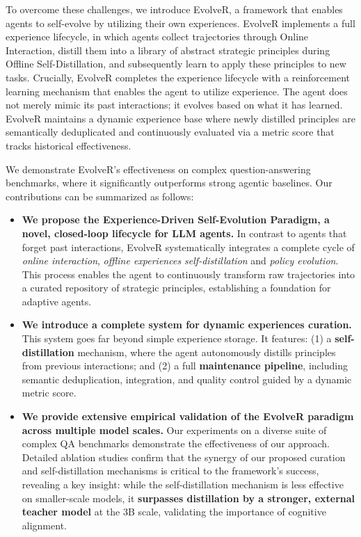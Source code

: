To overcome these challenges, we introduce EvolveR, a framework that enables agents to self-evolve by utilizing their own experiences. EvolveR implements a full experience lifecycle, in which agents collect trajectories through Online Interaction, distill them into a library of abstract strategic principles during Offline Self-Distillation, and subsequently learn to apply these principles to new tasks. Crucially, EvolveR completes the experience lifecycle with a reinforcement learning mechanism that enables the agent to utilize experience. The agent does not merely mimic its past interactions; it evolves based on what it has learned. EvolveR maintains a dynamic experience base where newly distilled principles are semantically deduplicated and continuously evaluated via a metric score that tracks historical effectiveness. 

We demonstrate EvolveR's effectiveness on complex question-answering benchmarks, where it significantly outperforms strong agentic baselines. Our contributions can be summarized as follows:

\begin{itemize}[leftmargin=2em]
    \item \textbf{We propose the Experience-Driven Self-Evolution Paradigm, a novel, closed-loop lifecycle for LLM agents.} In contrast to agents that forget past interactions, EvolveR systematically integrates a complete cycle of \textit{online interaction}, \textit{offline experiences self-distillation} and \textit{policy evolution}. This process enables the agent to continuously transform raw trajectories into a curated repository of strategic principles, establishing a foundation for adaptive agents.

    \item \textbf{We introduce a complete system for dynamic experiences curation.} This system goes far beyond simple experience storage. It features: (1) a \textbf{self-distillation} mechanism, where the agent autonomously distills principles from previous interactions; and (2) a full \textbf{maintenance pipeline}, including semantic deduplication, integration, and quality control guided by a dynamic metric score.


    \item \textbf{We provide extensive empirical validation of the EvolveR paradigm across multiple model scales.} Our experiments on a diverse suite of complex QA benchmarks demonstrate the effectiveness of our approach. 
    Detailed ablation studies confirm that the synergy of our proposed curation and self-distillation mechanisms is critical to the framework's success, revealing a key insight: while the self-distillation mechanism is less effective on smaller-scale models, it \textbf{surpasses distillation by a stronger, external teacher model} at the 3B scale, validating the importance of cognitive alignment.
    
\end{itemize}

